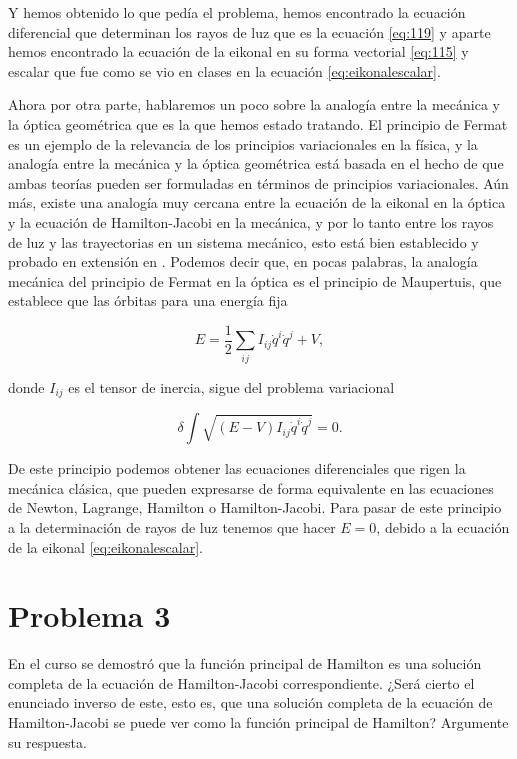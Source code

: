 \documentclass[a4paper,10pt]{article}
\numberwithin{equation}{section}
\begin{document}
Y hemos obtenido lo que pedía el problema, hemos encontrado la ecuación diferencial 
que determinan los rayos de luz que es la ecuación \eqref{eq:119} y aparte hemos encontrado 
la ecuación de la eikonal en su forma vectorial \eqref{eq:115} y escalar que fue 
como se vio en clases en la ecuación \eqref{eq:eikonalescalar}.

\vspace{.3cm}

Ahora por otra parte, hablaremos un poco sobre la analogía entre la mecánica y la 
óptica geométrica que es la que hemos estado tratando. El principio de Fermat es un 
ejemplo de la relevancia de los principios variacionales en la física, y la analogía 
entre la mecánica y la óptica geométrica está basada en el hecho de que ambas teorías 
pueden ser formuladas en términos de principios variacionales. Aún más, existe una 
analogía muy cercana entre la ecuación de la eikonal en la óptica y la ecuación de 
Hamilton-Jacobi en la mecánica, y por lo tanto entre los rayos de luz y las trayectorias 
en un sistema mecánico, esto está bien establecido y probado en extensión en 
\cite{romer}. Podemos decir que, en pocas palabras, la analogía mecánica del 
principio de Fermat en la óptica es el principio de Maupertuis, que establece que 
las órbitas para una energía fija

\begin{equation}
 E = \frac{1}{2}\sum_{ij} I_{ij} \dot{q}^i\dot{q}^j + V,
\end{equation}

donde $I_{ij}$ es el tensor de inercia, sigue del problema variacional 

\begin{equation}
 \delta \int \sqrt{(E-V)I_{ij} \dot{q}^i\dot{q}^j} = 0.
\end{equation}

De este principio podemos obtener las ecuaciones diferenciales que rigen la mecánica 
clásica, que pueden expresarse de forma equivalente en las ecuaciones de Newton, Lagrange, 
Hamilton o Hamilton-Jacobi. Para pasar de este principio a la determinación de 
rayos de luz tenemos que hacer $E=0$, debido a la ecuación de la eikonal \eqref{eq:eikonalescalar}.

\section{Problema 3}

En el curso se demostró que la función principal de Hamilton es una solución completa 
de la ecuación de Hamilton-Jacobi correspondiente. ¿Será cierto el enunciado inverso 
de este, esto es, que una solución completa de la ecuación de Hamilton-Jacobi se puede 
ver como la función principal de Hamilton? Argumente su respuesta.
\end{document}
